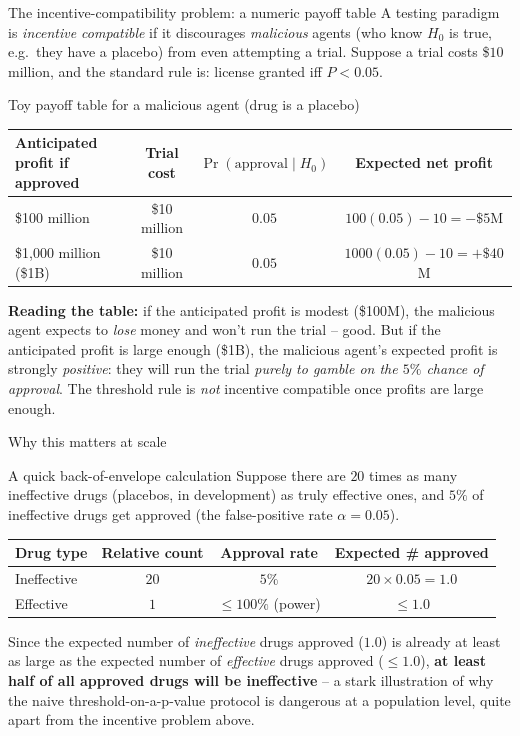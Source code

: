 \documentclass[aspectratio=169,10pt]{beamer}
\begin{document}
\begin{frame}{The incentive-compatibility problem: a numeric payoff table}
  A testing paradigm is \emph{incentive compatible} if it discourages
  \emph{malicious} agents (who know $H_0$ is true, e.g.\ they have a
  placebo) from even attempting a trial. Suppose a trial costs
  \$$10$ million, and the standard rule is: license granted iff $P<0.05$.

  \begin{block}{Toy payoff table for a malicious agent (drug is a placebo)}
    \begin{center}
    \begin{tabular}{lccc}
      \toprule
      Anticipated profit if approved & Trial cost & $\Pr(\text{approval}\mid H_0)$ & Expected net profit\\
      \midrule
      \$100 million & \$10 million & $0.05$ & $100(0.05)-10 = -\$5$M\\
      \$1{,}000 million (\$1B) & \$10 million & $0.05$ & $1000(0.05)-10=+\$40$M\\
      \bottomrule
    \end{tabular}
    \end{center}
  \end{block}
  \textbf{Reading the table:} if the anticipated profit is modest (\$100M),
  the malicious agent expects to \emph{lose} money and won't run the trial
  -- good. But if the anticipated profit is large enough (\$1B), the
  malicious agent's expected profit is strongly \emph{positive}: they will
  run the trial \emph{purely to gamble on the $5\%$ chance of approval}.
  The threshold rule is \emph{not} incentive compatible once profits are
  large enough.
\end{frame}

\begin{frame}{Why this matters at scale}
  \begin{block}{A quick back-of-envelope calculation}
    Suppose there are $20$ times as many ineffective drugs (placebos, in
    development) as truly effective ones, and $5\%$ of ineffective drugs get
    approved (the false-positive rate $\alpha=0.05$).
    \begin{center}
    \begin{tabular}{lccc}
      \toprule
      Drug type & Relative count & Approval rate & Expected \# approved\\
      \midrule
      Ineffective & $20$ & $5\%$ & $20\times0.05 = 1.0$\\
      Effective & $1$ & $\le 100\%$ (power) & $\le 1.0$\\
      \bottomrule
    \end{tabular}
    \end{center}
  \end{block}
  Since the expected number of \emph{ineffective} drugs approved ($1.0$) is
  already at least as large as the expected number of \emph{effective}
  drugs approved ($\le1.0$), \textbf{at least half of all approved drugs
  will be ineffective} -- a stark illustration of why the naive
  threshold-on-a-p-value protocol is dangerous at a population level, quite
  apart from the incentive problem above.
\end{frame}
\end{document}
